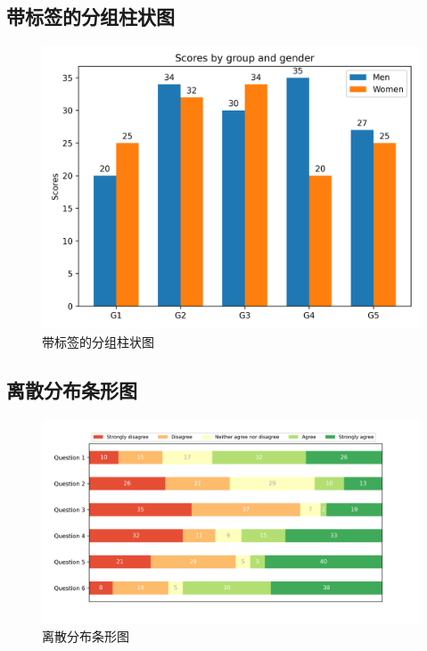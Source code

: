 \documentclass[openany]{progbookcn}
\begin{document}
\subsection{带标签的分组柱状图}

\begin{figure}[H]
\centering
\includegraphics[width=0.6 \textwidth]{figs/chapter9/bars/GroupedBar}
\caption{带标签的分组柱状图}
\end{figure}

\subsection{离散分布条形图}

\begin{figure}[H]
\centering
\includegraphics[width=0.6 \textwidth]{figs/chapter9/bars/DiscreteDistributionBar}
\caption{离散分布条形图}
\end{figure}
\end{document}
